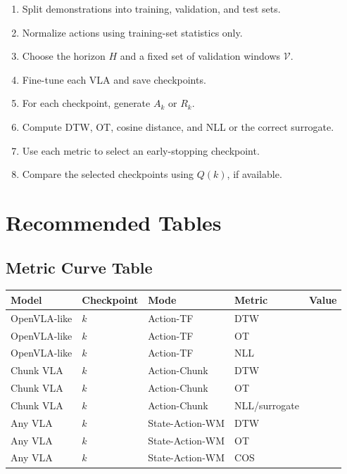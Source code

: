 \documentclass[11pt]{article}
\begin{document}
\begin{enumerate}
    \item Split demonstrations into training, validation, and test sets.
    \item Normalize actions using training-set statistics only.
    \item Choose the horizon $H$ and a fixed set of validation windows $\mathcal V$.
    \item Fine-tune each VLA and save checkpoints.
    \item For each checkpoint, generate $A_k$ or $R_k$.
    \item Compute DTW, OT, cosine distance, and NLL or the correct surrogate.
    \item Use each metric to select an early-stopping checkpoint.
    \item Compare the selected checkpoints using $Q(k)$, if available.
\end{enumerate}

\section{Recommended Tables}

\subsection*{Metric Curve Table}

\begin{center}
\begin{tabular}{llllr}
\toprule
Model & Checkpoint & Mode & Metric & Value \\
\midrule
OpenVLA-like & $k$ & Action-TF & DTW & \\
OpenVLA-like & $k$ & Action-TF & OT & \\
OpenVLA-like & $k$ & Action-TF & NLL & \\
Chunk VLA & $k$ & Action-Chunk & DTW & \\
Chunk VLA & $k$ & Action-Chunk & OT & \\
Chunk VLA & $k$ & Action-Chunk & NLL/surrogate & \\
Any VLA & $k$ & State-Action-WM & DTW & \\
Any VLA & $k$ & State-Action-WM & OT & \\
Any VLA & $k$ & State-Action-WM & COS & \\
\bottomrule
\end{tabular}
\end{center}
\end{document}
